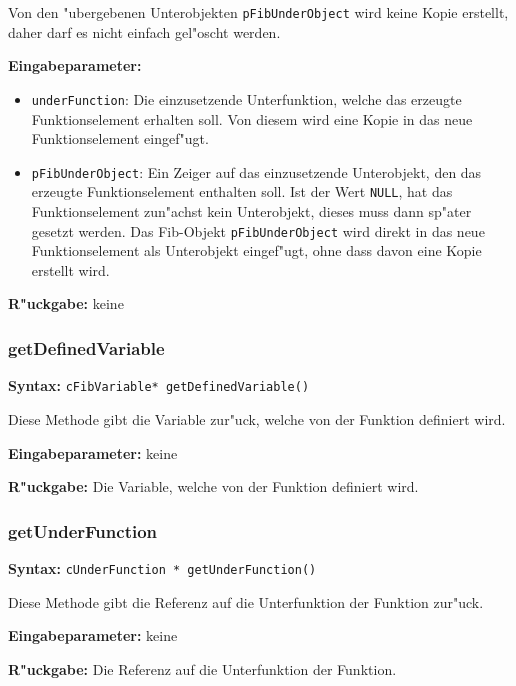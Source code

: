 Von den "ubergebenen Unterobjekten \verb|pFibUnderObject| wird keine Kopie erstellt, daher darf es nicht einfach gel"oscht werden.

\bigskip\noindent
\textbf{Eingabeparameter:}
\begin{itemize}
 \item \verb|underFunction|: Die einzusetzende Unterfunktion, welche das erzeugte Funktionselement erhalten soll. Von diesem wird eine Kopie in das neue Funktionselement eingef"ugt.
 \item \verb|pFibUnderObject|: Ein Zeiger auf das einzusetzende Unterobjekt, den das erzeugte Funktionselement enthalten soll. Ist der Wert \verb|NULL|, hat das Funktionselement zun"achst kein Unterobjekt, dieses muss dann sp"ater gesetzt werden. Das Fib-Objekt \verb|pFibUnderObject| wird direkt in das neue Funktionselement als Unterobjekt eingef"ugt, ohne dass davon eine Kopie erstellt wird.
\end{itemize}

\bigskip\noindent
\textbf{R"uckgabe:} keine


\subsubsection{getDefinedVariable}

\textbf{Syntax:} \verb|cFibVariable* getDefinedVariable()|

\bigskip\noindent
Diese Methode gibt die Variable zur"uck, welche von der Funktion definiert wird.

\bigskip\noindent
\textbf{Eingabeparameter:} keine

\bigskip\noindent
\textbf{R"uckgabe:} Die Variable, welche von der Funktion definiert wird.


\subsubsection{getUnderFunction}

\textbf{Syntax:} \verb|cUnderFunction * getUnderFunction()|

\bigskip\noindent
Diese Methode gibt die Referenz auf die Unterfunktion der Funktion zur"uck.

\bigskip\noindent
\textbf{Eingabeparameter:} keine

\bigskip\noindent
\textbf{R"uckgabe:} Die Referenz auf die Unterfunktion der Funktion.


